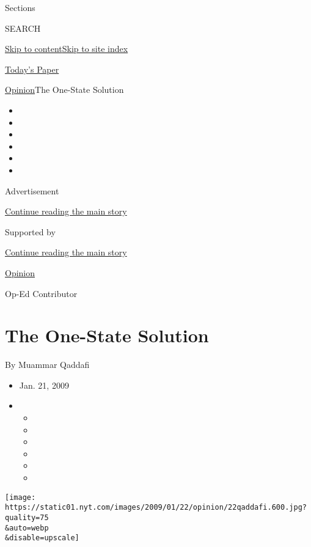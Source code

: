 Sections

SEARCH

\protect\hyperlink{site-content}{Skip to
content}\protect\hyperlink{site-index}{Skip to site index}

\href{https://myaccount.nytimes.com/auth/login?response_type=cookie\&client_id=vi}{}

\href{https://www.nytimes.com/section/todayspaper}{Today's Paper}

\href{/section/opinion}{Opinion}\textbar{}The One-State Solution

\begin{itemize}
\item
\item
\item
\item
\item
\item
\end{itemize}

Advertisement

\protect\hyperlink{after-top}{Continue reading the main story}

Supported by

\protect\hyperlink{after-sponsor}{Continue reading the main story}

\href{/section/opinion}{Opinion}

Op-Ed Contributor

\hypertarget{the-one-state-solution}{%
\section{The One-State Solution}\label{the-one-state-solution}}

By Muammar Qaddafi

\begin{itemize}
\item
  Jan. 21, 2009
\item
  \begin{itemize}
  \item
  \item
  \item
  \item
  \item
  \item
  \end{itemize}
\end{itemize}

\texttt{[image: https://static01.nyt.com/images/2009/01/22/opinion/22qaddafi.600.jpg?quality=75\\\&auto=webp\\\&disable=upscale]}

